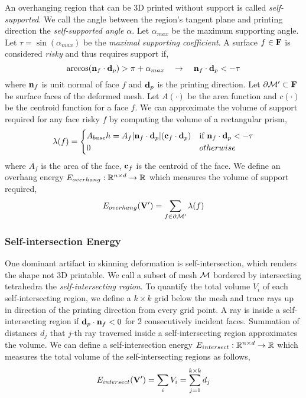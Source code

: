 An overhanging region that can be 3D printed without support is called \textit{self-supported}. We call the angle between the region's tangent plane and printing direction the \textit{self-supported angle} $\alpha$. Let $\alpha_{max}$ be the maximum supporting angle. Let $\tau = \sin(\alpha_{max})$ be the \textit{maximal supporting coefficient}. A surface $f\in \mathbf{F}$ is considered \textit{risky} and thus requires support if,
\[
    \arccos(\mathbf{n}_f \cdot \mathbf{d}_{p}) > \pi + \alpha_{max}
    \quad \rightarrow \quad
    \mathbf{n}_f \cdot \mathbf{d}_{p} < - \tau
\]
where $\mathbf{n}_f$ is unit normal of face $f$ and $\mathbf{d}_{p}$ is the printing direction. Let $\partial \mathcal{M}' \subset \mathbf{F}$ be surface faces of the deformed mesh. Let $A(\cdot)$ be the area function and $c(\cdot)$ be the centroid function for a face $f$. We can approximate the volume of support required for any face risky $f$ by computing the volume of a rectangular prism,
\[
    \lambda(f) = 
    \begin{cases}
        A_{base} h = A_f |\mathbf{n}_f \cdot \mathbf{d}_{p}| (\mathbf{c}_f \cdot \mathbf{d}_{p}) & \text{if } \mathbf{n}_f \cdot \mathbf{d}_{p} < -\tau \\
        0 & otherwise \\
    \end{cases}
\]
where $A_f$ is the area of the face, $\mathbf{c}_f$ is the centroid of the face. We define an overhang energy $E_{overhang}: \mathbb{R}^{n\times d} \to \mathbb{R}$ which measures the volume of support required,
\[
    E_{overhang}(\mathbf{V}') = \sum_{f\in \partial \mathcal{M}'} \lambda(f)
\]

\subsubsection*{Self-intersection Energy}

One dominant artifact in skinning deformation is self-intersection, which renders the shape not 3D printable. We call a subset of mesh $\mathcal{M}$ bordered by intersecting tetrahedra the \textit{self-intersecting region}. To quantify the total volume $V_i$ of each self-intersecting region, we define a $k\times k$ grid below the mesh and trace rays up in direction of the printing direction from every grid point. A ray is inside a self-intersecting region if $\mathbf{d}_{p} \cdot \mathbf{n}_f < 0$ for 2 consecutively incident faces. Summation of distances $d_j$ that $j$-th ray traversed inside a self-intersecting region approximates the volume. We can define a self-intersection energy $E_{intersect}: \mathbb{R}^{n\times d} \to \mathbb{R}$ which measures the total volume of the self-intersecting regions as follows,
\[
    E_{intersect}(\mathbf{V}') = \sum_i V_i = \sum_{j=1}^{k\times k} d_j
\]


